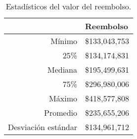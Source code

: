 \begin{table}[H]
\centering
\caption{Estadísticos del valor del reembolso.} 
\label{tab:reembolso}
\begin{tabular}{rl}
  \hline
 & Reembolso \\ 
  \hline
Mínimo & \$133,043,753 \\ 
  25\% & \$134,174,831 \\ 
  Mediana & \$195,499,631 \\ 
  75\% & \$296,980,006 \\ 
  Máximo & \$418,577,808 \\ 
  Promedio & \$235,655,206 \\ 
  Desviación estándar & \$134,961,712 \\ 
   \hline
\end{tabular}
\end{table}
